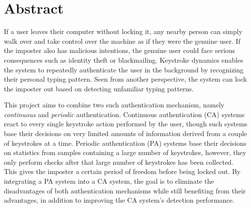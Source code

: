 \chapter*{Abstract}
If a user leaves their computer without locking it, any nearby person can simply walk over and take control over the machine as if they were the genuine user.
If the imposter also has malicious intentions, the genuine user could face serious consequences such as identity theft or blackmailing.
Keystroke dynamics enables the system to repeatedly authenticate the user in the background by recognizing their personal typing pattern.
Seen from another perspective, the system can lock the imposter out based on detecting unfamiliar typing patterns.

This project aims to combine two such authentication mechanism, namely \textit{continuous} and \textit{periodic} authentication. 
Continuous authentication (CA) systems react to every single keystroke action performed by the user, though such systems base their decisions on very limited amounts of information derived from a couple of keystrokes at a time.
Periodic authentication (PA) systems base their decisions on statistics from samples containing a large number of keystrokes, however, they only perform checks after that large number of keystrokes has been collected.
This gives the imposter a certain period of freedom before being locked out.
By integrating a PA system into a CA system, the goal is to eliminate the disadvantages of both authentication mechanisms while still benefiting from their advantages, in addition to improving the CA system's detection performance.
\hypersetup{pageanchor=false}